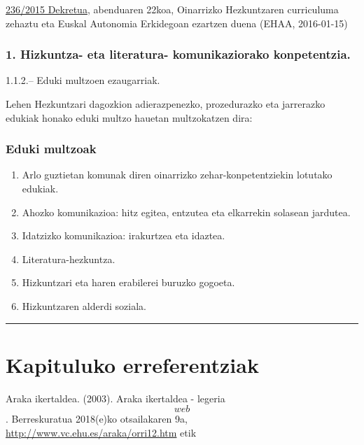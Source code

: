 \documentclass[]{book}
\providecommand{\tightlist}{%
  \setlength{\itemsep}{0pt}\setlength{\parskip}{0pt}}
\begin{document}
\href{http://www.jusap.ejgv.euskadi.eus/r47-bopvapps/es/bopv2/datos/2016/01/1600141e.pdf}{236/2015 Dekretua}, abenduaren 22koa, Oinarrizko Hezkuntzaren curriculuma zehaztu eta Euskal Autonomia Erkidegoan ezartzen duena (EHAA, 2016-01-15)

\hypertarget{hizkuntza--eta-literatura--komunikaziorako-konpetentzia.}{%
\subsubsection{1. Hizkuntza- eta literatura- komunikaziorako konpetentzia.}\label{hizkuntza--eta-literatura--komunikaziorako-konpetentzia.}}

1.1.2.-- Eduki multzoen ezaugarriak.

Lehen Hezkuntzari dagozkion adierazpenezko, prozedurazko eta jarrerazko edukiak honako eduki multzo hauetan multzokatzen dira:

\hypertarget{eduki-multzoak}{%
\subsubsection{Eduki multzoak}\label{eduki-multzoak}}

\begin{enumerate}
\def\labelenumi{\arabic{enumi}.}
\tightlist
\item
  Arlo guztietan komunak diren oinarrizko zehar-konpetentziekin lotutako edukiak.
\item
  Ahozko komunikazioa: hitz egitea, entzutea eta elkarrekin solasean jardutea.
\item
  Idatzizko komunikazioa: irakurtzea eta idaztea.
\item
  Literatura-hezkuntza.
\item
  Hizkuntzari eta haren erabilerei buruzko gogoeta.
\item
  Hizkuntzaren alderdi soziala.
\end{enumerate}

\begin{center}\rule{0.5\linewidth}{\linethickness}\end{center}

\hypertarget{kapituluko-erreferentziak}{%
\section{Kapituluko erreferentziak}\label{kapituluko-erreferentziak}}

Araka ikertaldea. (2003). Araka ikertaldea - legeria \[web\]. Berreskuratua 2018(e)ko otsailakaren 9a, \url{http://www.vc.ehu.es/araka/orri12.htm} etik
\end{document}
